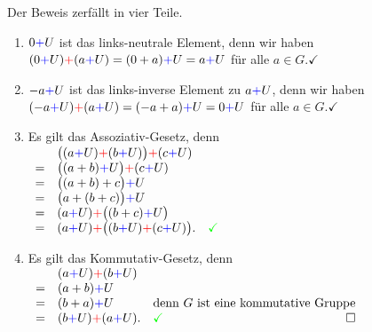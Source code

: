 \proof
Der Beweis zerf\"{a}llt in vier Teile.
\begin{enumerate}
\item $0 {\color{blue}{+}} U$ ist das links-neutrale Element, denn wir haben
      \\[0.2cm]
      \hspace*{1.3cm}
      $(0 {\color{blue}{+}} U) {\color{red}{+}} (a {\color{blue}{+}} U) = (0 + a) {\color{blue}{+}} U = a {\color{blue}{+}} U$ \quad f\"{u}r alle $a \in G$.{\color{green}$\checkmark$}
\item $-a {\color{blue}{+}} U$ ist das links-inverse Element zu $a {\color{blue}{+}} U$, denn wir haben
      \\[0.2cm]
      \hspace*{1.3cm}
      $(-a {\color{blue}{+}} U) {\color{red}{+}} (a {\color{blue}{+}} U) = (-a + a) {\color{blue}{+}} U = 0 {\color{blue}{+}} U$ \quad f\"{u}r alle $a \in G$.{\color{green}$\checkmark$}
\item Es gilt das Assoziativ-Gesetz, denn
      \\[0.2cm]
      \hspace*{1.3cm}
      $
      \begin{array}[t]{cll}
        & \bigl((a {\color{blue}{+}} U) {\color{red}{+}} (b {\color{blue}{+}} U)\bigr) {\color{red}{+}} (c {\color{blue}{+}} U)   \\
      = & \bigl((a + b) {\color{blue}{+}} U\bigr) {\color{red}{+}} (c {\color{blue}{+}} U)         \\
      = & \bigl((a + b) + c\bigr) {\color{blue}{+}} U               \\
      = & \bigl(a + (b + c)\bigr) {\color{blue}{+}} U               \\
      = & (a {\color{blue}{+}} U) {\color{red}{+}} \bigl((b + c) {\color{blue}{+}} U\bigr)         \\
      = & (a {\color{blue}{+}} U) {\color{red}{+}} \bigl((b {\color{blue}{+}} U) {\color{red}{+}} (c {\color{blue}{+}} U)\bigr). &
              {\color{green}\checkmark}  \\
      \end{array}
      $
\item Es gilt das Kommutativ-Gesetz, denn
      \\[0.2cm]
      \hspace*{1.3cm}
      $
      \begin{array}[t]{cll}
        & (a {\color{blue}{+}} U) {\color{red}{+}} (b {\color{blue}{+}} U) \\
      = & (a + b) {\color{blue}{+}} U       \\
      = & (b + a) {\color{blue}{+}} U & \mbox{denn $G$ ist eine kommutative Gruppe} \\
      = & (b {\color{blue}{+}} U) {\color{red}{+}} (a {\color{blue}{+}} U). &
      {\color{green}\checkmark} \qquad
      \hspace*{\fill} \Box
      \end{array}
      $
\end{enumerate}

